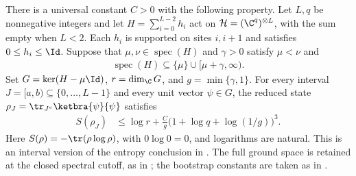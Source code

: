 \begin{theorem}
    \label{thm:physical_dg_interval_entropy_bound}
    \leanok
    There is a universal constant $C>0$ with the following property.
    Let $L,q$ be nonnegative integers and let $H=\sum_{i=0}^{L-2}h_i$ act on
    $\mathcal H=(\C^q)^{\otimes L}$, with the sum empty when $L<2$.
    Each $h_i$ is supported on sites $i,i+1$ and satisfies $0\le h_i\le\Id$.
    Suppose that $\mu,\nu\in\operatorname{spec}(H)$ and $\gamma>0$ satisfy
    $\mu<\nu$ and
    \begin{align*}
        \operatorname{spec}(H)\subseteq\{\mu\}\cup[\mu+\gamma,\infty).
    \end{align*}
    Set $G=\ker(H-\mu\Id)$, $r=\dim_{\C}G$, and $g=\min\{\gamma,1\}$.
    For every interval $J=[a,b)\subseteq\{0,\ldots,L-1\}$ and every unit vector
    $\psi\in G$, the reduced state
    $\rho_J=\tr_{J^c}\ketbra{\psi}{\psi}$ satisfies
    \begin{align}
        S(\rho_J)
         & \le \log r+\frac{C}{g}
        \bigl(1+\log q+\log(1/g)\bigr)^3.
        \label{eq:physical_dg_interval_entropy}
    \end{align}
    Here $S(\rho)=-\tr(\rho\log\rho)$, with $0\log0=0$, and logarithms are natural.
    This is an interval version of the entropy conclusion in
    \cite[Theorem~4.9]{Arad2016RigorousRG}.
    The full ground space is retained at the closed spectral cutoff, as in
    \cite{gap:alvv16_spectral_projector_boundary}; the bootstrap constants are
    taken as in \cite{gap:alvv16_bootstrap_constants}.
\end{theorem}

